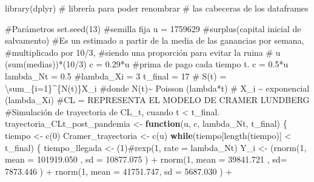 \documentclass[
  us-letterpaper,
]{scrreprt}
\newenvironment{Shaded}{\begin{snugshade}}{\end{snugshade}}
\newcommand{\AttributeTok}[1]{\textcolor[rgb]{0.40,0.45,0.13}{#1}}
\newcommand{\CommentTok}[1]{\textcolor[rgb]{0.37,0.37,0.37}{#1}}
\newcommand{\ControlFlowTok}[1]{\textcolor[rgb]{0.00,0.23,0.31}{\textbf{#1}}}
\newcommand{\DecValTok}[1]{\textcolor[rgb]{0.68,0.00,0.00}{#1}}
\newcommand{\FloatTok}[1]{\textcolor[rgb]{0.68,0.00,0.00}{#1}}
\newcommand{\FunctionTok}[1]{\textcolor[rgb]{0.28,0.35,0.67}{#1}}
\newcommand{\NormalTok}[1]{\textcolor[rgb]{0.00,0.23,0.31}{#1}}
\newcommand{\OtherTok}[1]{\textcolor[rgb]{0.00,0.23,0.31}{#1}}
\newcommand{\SpecialCharTok}[1]{\textcolor[rgb]{0.37,0.37,0.37}{#1}}
\theoremstyle{plain}
\theoremstyle{plain}
\theoremstyle{definition}
\theoremstyle{remark}
\begin{document}
\begin{Shaded}
\begin{Highlighting}[]
\FunctionTok{library}\NormalTok{(dplyr) }\CommentTok{\# librería para poder renombrar }
\CommentTok{\# las cabeceras de los dataframes}

\CommentTok{\#Parámetros}
\FunctionTok{set.seed}\NormalTok{(}\DecValTok{13}\NormalTok{) }\CommentTok{\#semilla fija}
\NormalTok{u }\OtherTok{=} \DecValTok{1759629} \CommentTok{\#surplus(capital inicial de salvamento)}
\CommentTok{\#Es un estimado a partir de la media de las ganancias por semana, }
\CommentTok{\#multiplicado por 10/3, }
\CommentTok{\#siendo una proporción para evitar la ruina}
\CommentTok{\# u (sum(medias))*(10/3)}
\NormalTok{c }\OtherTok{=} \FloatTok{0.29}\SpecialCharTok{*}\NormalTok{u }\CommentTok{\#prima de pago cada tiempo t. c = 0.5*u}
\NormalTok{lambda\_Nt }\OtherTok{=} \FloatTok{0.5}
\CommentTok{\#lambda\_Xi = 3}
\NormalTok{t\_final }\OtherTok{=} \DecValTok{17}
\CommentTok{\# S(t) = \textbackslash{}sum\_\{i=1\}\^{}\{N(t)\}X\_i}
\CommentTok{\#donde N(t)\textasciitilde{} Poisson (lambda*t)}
\CommentTok{\# X\_i \textasciitilde{} exponencial (lambda\_Xi)}
\CommentTok{\#CL = REPRESENTA EL MODELO DE CRAMER LUNDBERG}
\CommentTok{\#Simulación de trayectoria de CL\_t, cuando t \textless{} t\_final.}
\NormalTok{trayectoria\_CLt\_post\_pandemia }\OtherTok{\textless{}{-}} \ControlFlowTok{function}\NormalTok{(u, c, lambda\_Nt, t\_final)}
\NormalTok{\{}
\NormalTok{  tiempo }\OtherTok{\textless{}{-}} \FunctionTok{c}\NormalTok{(}\DecValTok{0}\NormalTok{)}
\NormalTok{  Cramer\_trayectoria }\OtherTok{\textless{}{-}} \FunctionTok{c}\NormalTok{(u)}
  \ControlFlowTok{while}\NormalTok{(tiempo[}\FunctionTok{length}\NormalTok{(tiempo)] }\SpecialCharTok{\textless{}}\NormalTok{ t\_final)}
\NormalTok{  \{}
\NormalTok{    tiempo\_llegada }\OtherTok{\textless{}{-}}\NormalTok{ (}\DecValTok{1}\NormalTok{)}\CommentTok{\#rexp(1, rate = lambda\_Nt)}
\NormalTok{    Y\_i }\OtherTok{\textless{}{-}}\NormalTok{  (}\FunctionTok{rnorm}\NormalTok{(}\DecValTok{1}\NormalTok{, }\AttributeTok{mean =} \FloatTok{101919.050}\NormalTok{ , }\AttributeTok{sd =} \FloatTok{10877.075}\NormalTok{  ) }
\SpecialCharTok{+} \FunctionTok{rnorm}\NormalTok{(}\DecValTok{1}\NormalTok{, }\AttributeTok{mean =}  \FloatTok{39841.721}\NormalTok{ , }\AttributeTok{sd=} \FloatTok{7873.446} 
\NormalTok{    ) }\SpecialCharTok{+}  
\FunctionTok{rnorm}\NormalTok{(}\DecValTok{1}\NormalTok{, }\AttributeTok{mean =}   \FloatTok{41751.747}\NormalTok{, }\AttributeTok{sd =} \FloatTok{5687.030}\NormalTok{  ) }\SpecialCharTok{+} 

\end{Highlighting}
\end{Shaded}
\end{document}
